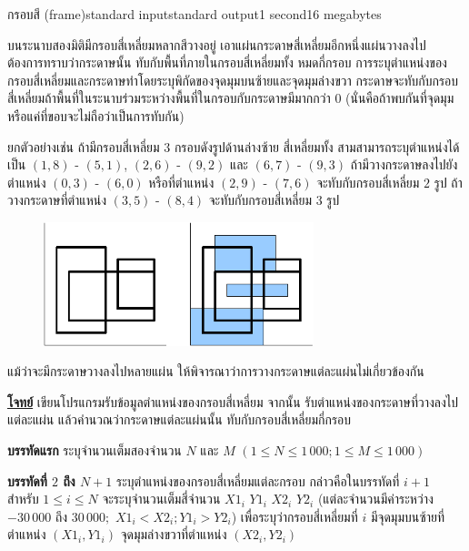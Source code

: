 \documentclass[11pt,a4paper]{article}
\begin{document}
\begin{problem}{กรอบสี (frame)}{standard input}{standard output}{1 second}{16 megabytes}

บนระนาบสองมิติมีกรอบสี่เหลี่ยมหลากสีวางอยู่ เอาแผ่นกระดาษสี่เหลี่ยมอีกหนึ่งแผ่นวางลงไป ต้องการทราบว่ากระดาษนั้น ทับกับพื้นที่ภายในกรอบสี่เหลี่ยมทั้ง หมดกี่กรอบ การระบุตำแหน่งของกรอบสี่เหลี่ยมและกระดาษทำโดยระบุพิกัดของจุดมุมบนซ้ายและจุดมุมล่างขวา กระดาษจะทับกับกรอบสี่เหลี่ยมถ้าพื้นที่ในระนาบร่วมระหว่างพื้นที่ในกรอบกับกระดาษมีมากกว่า $0$ (นั่นคือถ้าพบกันที่จุดมุมหรือแค่ที่ขอบจะไม่ถือว่าเป็นการทับกัน)

                ยกตัวอย่างเช่น ถ้ามีกรอบสี่เหลี่ยม $3$ กรอบดังรูปด้านล่างซ้าย สี่เหลี่ยมทั้ง สามสามารถระบุตำแหน่งได้เป็น $(1,8)$ - $(5,1)$, $(2,6)$ - $(9,2)$ และ $(6,7)$ - $(9,3)$ ถ้ามีวางกระดาษลงไปยังตำแหน่ง $(0,3)$ - $(6,0)$ หรือที่ตำแหน่ง $(2,9)$ - $(7,6)$ จะทับกับกรอบสี่เหลี่ยม $2$ รูป ถ้าวางกระดาษที่ตำแหน่ง $(3,5)$ - $(8,4)$ จะทับกับกรอบสี่เหลี่ยม $3$ รูป

         
                
\begin{figure}[h!]
\centering
\includegraphics[width=0.7\textwidth]{../latex/img/1065/1065-1.png}
\end{figure}


  แม้ว่าจะมีกระดาษวางลงไปหลายแผ่น ให้พิจารณาว่าการวางกระดาษแต่ละแผ่นไม่เกี่ยวข้องกัน
  
\bigskip
\underline{\textbf{โจทย์}}  เขียนโปรแกรมรับข้อมูลตำแหน่งของกรอบสี่เหลี่ยม จากนั้น รับตำแหน่งของกระดาษที่วางลงไปแต่ละแผ่น แล้วคำนวณว่ากระดาษแต่ละแผ่นนั้น ทับกับกรอบสี่เหลี่ยมกี่กรอบ

\InputFile

\textbf{บรรทัดแรก} ระบุจำนวนเต็มสองจำนวน $N$ และ $M$ $(1 \leq N \leq 1\,000; 1 \leq M \leq 1\,000)$

\textbf{บรรทัดที่ $2$ ถึง $N+1$} ระบุตำแหน่งของกรอบสี่เหลี่ยมแต่ละกรอบ กล่าวคือในบรรทัดที่ $i+1$ สำหรับ $1 \leq i \leq N$ จะระบุจำนวนเต็มสี่จำนวน $X1_i$ $Y1_i$ $X2_i$ $Y2_i$ (แต่ละจำนวนมีค่าระหว่าง $-30\,000$ ถึง $30\,000;$ $X1_i < X2_i ; Y1_i > Y2_i$) เพื่อระบุว่ากรอบสี่เหลี่ยมที่ $i$ มีจุดมุมบนซ้ายที่ตำแหน่ง $(X1_i, Y1_i)$ จุดมุมล่างขวาที่ตำแหน่ง $(X2_i, Y2_i)$


\end{problem}
\end{document}
